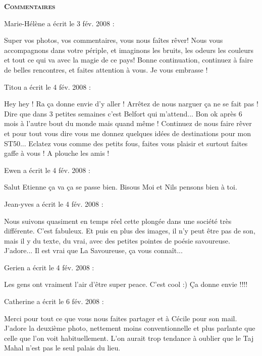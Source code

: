 \bigskip
\textbf{\textsc{Commentaires}}

\medskip
Marie-Hélène a écrit le 3 fév. 2008 :
\begin{displayquote}
Super vos photos, vos commentaires, vous nous faîtes rêver! Nous vous accompagnons dans votre périple, et imaginons les bruits, les odeurs les couleurs et tout ce qui va avec la magie de ce pays!
Bonne continuation, continuez à faire de belles rencontres, et faites attention à vous.
Je vous embrasse !
\end{displayquote}

\medskip
Titou a écrit le 4 fév. 2008 :
\begin{displayquote}
Hey hey ! Ra ça donne envie d'y aller ! Arrêtez de nous narguer ça ne se fait pas ! Dire que dans 3 petites semaines c'est Belfort qui m'attend... Bon ok après 6 mois à l'autre bout du monde mais quand même ! Continuez de nous faire rêver et pour tout vous dire vous me donnez quelques idées de destinations pour mon ST50...
Eclatez vous comme des petits fous, faites vous plaisir et surtout faites gaffe à vous ! A plouche les amis !
\end{displayquote}

\medskip
Ewen a écrit le 4 fév. 2008 :
\begin{displayquote}
Salut Etienne ça va ça se passe	bien.
Bisous Moi et Nils pensons bien à toi.
\end{displayquote}

\medskip
Jean-yves a écrit le 4 fév. 2008 :
\begin{displayquote}
Nous suivons quasiment en temps réel cette plongée dans une société très différente. C'est fabuleux. Et puis en plus des images, il n'y peut être pas de son, mais il y du texte, du vrai, avec des petites pointes de poésie savoureuse. J'adore...
Il est vrai que La Savoureuse, ça vous connaît...
\end{displayquote}

\medskip
Gerien a écrit le 4 fév. 2008 :
\begin{displayquote}
Les gens ont vraiment l'air d'être super peace. C'est cool :)
Ça donne envie !!!!
\end{displayquote}

\medskip
Catherine a écrit le 6 fév. 2008 :
\begin{displayquote}
Merci pour tout ce que vous nous faites partager et à Cécile pour son mail.
J'adore la deuxième photo, nettement moins conventionnelle et plus parlante que celle que l'on voit habituellement. L'on aurait trop tendance à oublier que le Taj Mahal n'est pas le seul palais du lieu.
\end{displayquote}

